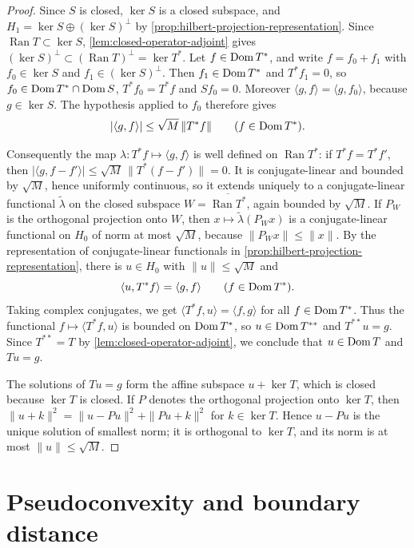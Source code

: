 \begin{proof}
Since $S$ is closed, $\ker S$ is a closed subspace, and $H_1=\ker S\oplus(\ker S)^\perp$ by \cref{prop:hilbert-projection-representation}. Since $\operatorname{Ran}T\subset\ker S$, \cref{lem:closed-operator-adjoint} gives $(\ker S)^\perp\subset(\operatorname{Ran}T)^\perp=\ker T^*$. Let $f\in\operatorname{Dom} T^*$, and write $f=f_0+f_1$ with $f_0\in\ker S$ and $f_1\in(\ker S)^\perp$. Then $f_1\in\operatorname{Dom} T^*$ and $T^*f_1=0$, so $f_0\in\operatorname{Dom} T^*\cap\operatorname{Dom} S$, $T^*f_0=T^*f$ and $Sf_0=0$. Moreover $\langle g,f\rangle=\langle g,f_0\rangle$, because $g\in\ker S$. The hypothesis applied to $f_0$ therefore gives
\[
 |\langle g,f\rangle|\le\sqrt M\,\|T^*f\|\qquad(f\in\operatorname{Dom} T^*).
\]

Consequently the map $\lambda\colon T^*f\mapsto\langle g,f\rangle$ is well defined on $\operatorname{Ran}T^*$: if $T^*f=T^*f'$, then $|\langle g,f-f'\rangle|\le\sqrt M\,\|T^*(f-f')\|=0$. It is conjugate-linear and bounded by $\sqrt M$, hence uniformly continuous, so it extends uniquely to a conjugate-linear functional $\tilde\lambda$ on the closed subspace $W=\overline{\operatorname{Ran}T^*}$, again bounded by $\sqrt M$. If $P_W$ is the orthogonal projection onto $W$, then $x\mapsto\tilde\lambda(P_Wx)$ is a conjugate-linear functional on $H_0$ of norm at most $\sqrt M$, because $\|P_Wx\|\le\|x\|$. By the representation of conjugate-linear functionals in \cref{prop:hilbert-projection-representation}, there is $u\in H_0$ with $\|u\|\le\sqrt M$ and
\[
 \langle u,T^*f\rangle=\langle g,f\rangle\qquad(f\in\operatorname{Dom} T^*).
\]
Taking complex conjugates, we get $\langle T^*f,u\rangle=\langle f,g\rangle$ for all $f\in\operatorname{Dom} T^*$. Thus the functional $f\mapsto\langle T^*f,u\rangle$ is bounded on $\operatorname{Dom} T^*$, so $u\in\operatorname{Dom} T^{**}$ and $T^{**}u=g$. Since $T^{**}=T$ by \cref{lem:closed-operator-adjoint}, we conclude that $u\in\operatorname{Dom} T$ and $Tu=g$.

The solutions of $Tu=g$ form the affine subspace $u+\ker T$, which is closed because $\ker T$ is closed. If $P$ denotes the orthogonal projection onto $\ker T$, then $\|u+k\|^2=\|u-Pu\|^2+\|Pu+k\|^2$ for $k\in\ker T$. Hence $u-Pu$ is the unique solution of smallest norm; it is orthogonal to $\ker T$, and its norm is at most $\|u\|\le\sqrt M$.
\end{proof}

\section{Pseudoconvexity and boundary distance}
\label{sec:pseudoconvex-distance}

